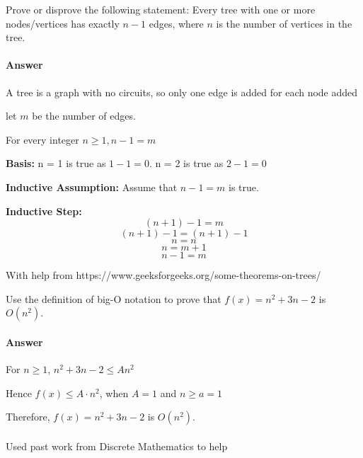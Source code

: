 \documentclass{article}
\begin{document}
\collab{}

Prove or disprove the following statement: Every tree with one or more
nodes/vertices has exactly $n-1$ edges, where $n$ is the number of vertices in
the tree.

\paragraph{Answer}

A tree is a graph with no circuits, so only one edge is added for each node added

let $m$ be the number of edges.

For every integer $n \geq 1, n - 1 = m$

{\bf Basis:} n = 1 is true as $1 - 1 = 0$. n = 2 is true as $2-1=0$

{\bf Inductive Assumption:} Assume that $n - 1 = m$ is true.

    {\bf Inductive Step:} $$(n+1) -1 = m $$
$$(n+1) -1 = (n +1) - 1$$
$$n=n$$
$$n=m +1$$
$$n-1=m$$

With help from https://www.geeksforgeeks.org/some-theorems-on-trees/


\collab{}

Use the definition of big-O notation to prove that $f(x)=n^2 + 3n -2$ is
$O(n^2)$.

\paragraph{Answer}

For $n \ge 1$, $ n^2 + 3n -2 \leq A n^2$

Hence $f(x) \leq A \cdot n^2$, when $A = 1$ and $n \geq a = 1$

Therefore, $f(x)=n^2 + 3n -2$ is $O(n^2)$.

\paragraph{}
Used past work from Discrete Mathematics to help
\end{document}
